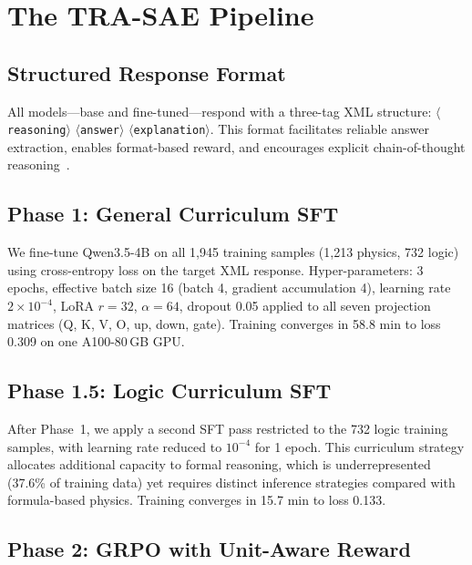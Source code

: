 \documentclass{ieeeaccess}
\newcommand{\modelname}{\textsc{TRA-SAE}}
\newcommand{\basemodelname}{Qwen3.5-4B}
\begin{document}
\section{The \modelname{} Pipeline}
\label{sec:method}

\subsection{Structured Response Format}
\label{sec:format}

All models---base and fine-tuned---respond with a three-tag XML structure:
$\langle$\texttt{reasoning}$\rangle$
$\langle$\texttt{answer}$\rangle$
$\langle$\texttt{explanation}$\rangle$.
This format facilitates reliable answer extraction, enables format-based
reward, and encourages explicit chain-of-thought reasoning~\cite{Wei2022}.

\subsection{Phase 1: General Curriculum SFT}

We fine-tune \basemodelname{} on all 1,945 training samples
(1,213 physics, 732 logic) using cross-entropy loss on the target XML
response.
Hyper-parameters: 3 epochs, effective batch size 16 (batch 4,
gradient accumulation 4), learning rate $2\!\times\!10^{-4}$,
LoRA $r=32$, $\alpha=64$, dropout 0.05 applied to all seven projection
matrices (Q, K, V, O, up, down, gate).
Training converges in 58.8 min to loss 0.309 on one A100-80\,GB GPU.

\subsection{Phase 1.5: Logic Curriculum SFT}

After Phase~1, we apply a second SFT pass restricted to the 732 logic
training samples, with learning rate reduced to $10^{-4}$ for 1 epoch.
This curriculum strategy allocates additional capacity to formal reasoning,
which is underrepresented (37.6\% of training data) yet requires distinct
inference strategies compared with formula-based physics.
Training converges in 15.7 min to loss 0.133.

\subsection{Phase 2: GRPO with Unit-Aware Reward}
\end{document}
